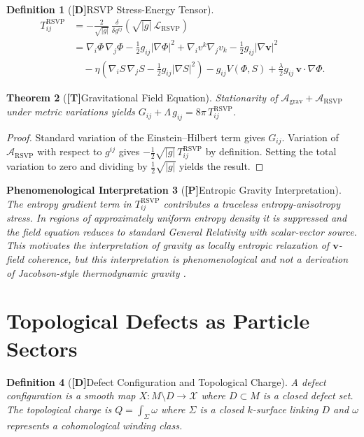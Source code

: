 \documentclass[12pt,a4paper]{article}
\newcommand{\claimD}{\textbf{[D]}\;}
\newcommand{\claimT}{\textbf{[T]}\;}
\newcommand{\claimP}{\textbf{[P]}\;}
\newtheorem{defn}{Definition}[section]
\newtheorem{appthm}[defn]{Theorem}
\newtheorem{appphen}[defn]{Phenomenological Interpretation}
\newcommand{\RSVP}{\textrm{RSVP}}
\begin{document}
\begin{defn}[\claimD RSVP Stress-Energy Tensor]
\begin{align*}
T^{\mathrm{RSVP}}_{ij}
&= -\frac{2}{\sqrt{|g|}}\,
   \frac{\delta}{\delta g^{ij}}\!\left(\sqrt{|g|}\,\mathcal{L}_{\mathrm{RSVP}}\right)\\
&= \nabla_i\Phi\,\nabla_j\Phi
  - \tfrac{1}{2}g_{ij}|\nabla\Phi|^2
  + \nabla_i v^k\nabla_j v_k
  - \tfrac{1}{2}g_{ij}|\nabla\mathbf{v}|^2\\
&\quad
  - \eta\!\left(\nabla_i S\,\nabla_j S - \tfrac{1}{2}g_{ij}|\nabla S|^2\right)
  - g_{ij}V(\Phi,S)
  + \tfrac{\lambda}{2}g_{ij}\,\mathbf{v}\cdot\nabla\Phi.
\end{align*}
\end{defn}

\begin{appthm}[\claimT Gravitational Field Equation]
Stationarity of $\mathcal{A}_{\mathrm{grav}} + \mathcal{A}_{\mathrm{RSVP}}$
under metric variations yields
$G_{ij} + \Lambda\,g_{ij} = 8\pi\,T^{\mathrm{RSVP}}_{ij}$.
\end{appthm}

\begin{proof}
Standard variation of the Einstein--Hilbert term gives $G_{ij}$. Variation
of $\mathcal{A}_\RSVP$ with respect to $g^{ij}$ gives
$-\frac{1}{2}\sqrt{|g|}\,T^{\mathrm{RSVP}}_{ij}$ by definition.
Setting the total variation to zero and dividing by $\frac{1}{2}\sqrt{|g|}$
yields the result.
\end{proof}

\begin{appphen}[\claimP Entropic Gravity Interpretation]
The entropy gradient term in $T^\RSVP_{ij}$ contributes a traceless
entropy-anisotropy stress. In regions of approximately uniform entropy density
it is suppressed and the field equation reduces to standard General Relativity
with scalar-vector source. This motivates the interpretation of gravity as
locally entropic relaxation of $\mathbf{v}$-field coherence, but this
interpretation is phenomenological and not a derivation of Jacobson-style
thermodynamic gravity \cite{Jacobson1995}.
\end{appphen}

\section{Topological Defects as Particle Sectors}

\begin{defn}[\claimD Defect Configuration and Topological Charge]
A \emph{defect configuration} is a smooth map $X: M\setminus D\to\mathcal{X}$
where $D\subset M$ is a closed defect set. The topological charge is
$Q = \int_\Sigma \omega$ where $\Sigma$ is a closed $k$-surface linking $D$
and $\omega$ represents a cohomological winding class.
\end{defn}
\end{document}

